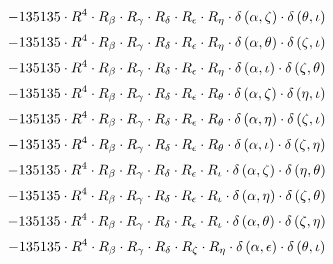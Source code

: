 \begin{subequations}
\begin{gather}
 \\[0.2em] \notag 		 - 135135 \cdot R^{4} \cdot R_{\beta{}} \cdot R_{\gamma{}} \cdot R_{\delta{}} \cdot R_{\epsilon{}} \cdot R_{\eta{}} \cdot \delta{}\left(\alpha{}, \zeta{}\right) \cdot \delta{}\left(\theta{}, \iota{}\right) 
 \\[0.2em] \notag 		 - 135135 \cdot R^{4} \cdot R_{\beta{}} \cdot R_{\gamma{}} \cdot R_{\delta{}} \cdot R_{\epsilon{}} \cdot R_{\eta{}} \cdot \delta{}\left(\alpha{}, \theta{}\right) \cdot \delta{}\left(\zeta{}, \iota{}\right) 
 \\[0.2em] \notag 		 - 135135 \cdot R^{4} \cdot R_{\beta{}} \cdot R_{\gamma{}} \cdot R_{\delta{}} \cdot R_{\epsilon{}} \cdot R_{\eta{}} \cdot \delta{}\left(\alpha{}, \iota{}\right) \cdot \delta{}\left(\zeta{}, \theta{}\right) 
 \\[0.2em] \notag 		 - 135135 \cdot R^{4} \cdot R_{\beta{}} \cdot R_{\gamma{}} \cdot R_{\delta{}} \cdot R_{\epsilon{}} \cdot R_{\theta{}} \cdot \delta{}\left(\alpha{}, \zeta{}\right) \cdot \delta{}\left(\eta{}, \iota{}\right) 
 \\[0.2em] \notag 		 - 135135 \cdot R^{4} \cdot R_{\beta{}} \cdot R_{\gamma{}} \cdot R_{\delta{}} \cdot R_{\epsilon{}} \cdot R_{\theta{}} \cdot \delta{}\left(\alpha{}, \eta{}\right) \cdot \delta{}\left(\zeta{}, \iota{}\right) 
 \\[0.2em] \notag 		 - 135135 \cdot R^{4} \cdot R_{\beta{}} \cdot R_{\gamma{}} \cdot R_{\delta{}} \cdot R_{\epsilon{}} \cdot R_{\theta{}} \cdot \delta{}\left(\alpha{}, \iota{}\right) \cdot \delta{}\left(\zeta{}, \eta{}\right) 
 \\[0.2em] \notag 		 - 135135 \cdot R^{4} \cdot R_{\beta{}} \cdot R_{\gamma{}} \cdot R_{\delta{}} \cdot R_{\epsilon{}} \cdot R_{\iota{}} \cdot \delta{}\left(\alpha{}, \zeta{}\right) \cdot \delta{}\left(\eta{}, \theta{}\right) 
 \\[0.2em] \notag 		 - 135135 \cdot R^{4} \cdot R_{\beta{}} \cdot R_{\gamma{}} \cdot R_{\delta{}} \cdot R_{\epsilon{}} \cdot R_{\iota{}} \cdot \delta{}\left(\alpha{}, \eta{}\right) \cdot \delta{}\left(\zeta{}, \theta{}\right) 
 \\[0.2em] \notag 		 - 135135 \cdot R^{4} \cdot R_{\beta{}} \cdot R_{\gamma{}} \cdot R_{\delta{}} \cdot R_{\epsilon{}} \cdot R_{\iota{}} \cdot \delta{}\left(\alpha{}, \theta{}\right) \cdot \delta{}\left(\zeta{}, \eta{}\right) 
 \\[0.2em] \notag 		 - 135135 \cdot R^{4} \cdot R_{\beta{}} \cdot R_{\gamma{}} \cdot R_{\delta{}} \cdot R_{\zeta{}} \cdot R_{\eta{}} \cdot \delta{}\left(\alpha{}, \epsilon{}\right) \cdot \delta{}\left(\theta{}, \iota{}\right) 

\end{gather}
\end{subequations}
